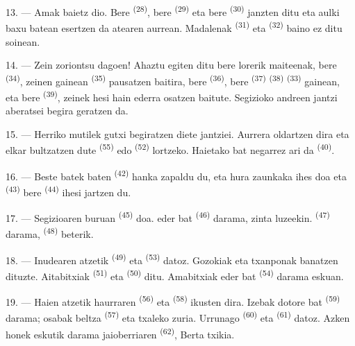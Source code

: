 13. --- Amak baietz dio. Bere  \textsuperscript{(28)}, bere
 \textsuperscript{(29)} eta bere 
\textsuperscript{(30)} janzten ditu eta aulki baxu batean esertzen da atearen
aurrean. Madalenak  \textsuperscript{(31)} eta 
\textsuperscript{(32)} baino ez ditu soinean.

14. --- Zein zoriontsu dagoen! Ahaztu egiten ditu bere lorerik maiteenak, bere
 \textsuperscript{(34)}, zeinen gainean 
\textsuperscript{(35)} pausatzen baitira, bere 
\textsuperscript{(36)}, bere  \textsuperscript{(37)}
 \textsuperscript{(38)} 
\textsuperscript{(33)} gainean, eta bere 
\textsuperscript{(39)}, zeinek hesi hain ederra osatzen baitute. Segizioko andreen
jantzi aberatsei begira geratzen da.

15. --- Herriko mutilek gutxi begiratzen diete jantziei. Aurrera oldartzen dira
eta elkar bultzatzen dute  \textsuperscript{(55)} edo
 \textsuperscript{(52)} lortzeko. Haietako bat negarrez ari da
\textsuperscript{(40)}.

16. --- Beste batek  baten \textsuperscript{(42)} hanka zapaldu du,
eta hura zaunkaka ihes doa eta  \textsuperscript{(43)} bere
 \textsuperscript{(44)} ihesi jartzen du.

\VUsaut{5.0mm}
\VUsaut{4.0mm}

17. --- Segizioaren buruan  \textsuperscript{(45)} doa. 
eder bat \textsuperscript{(46)} darama, zinta luzeekin. 
\textsuperscript{(47)} darama,  \textsuperscript{(48)} beterik.

18. --- Inudearen atzetik  \textsuperscript{(49)} eta
 \textsuperscript{(53)} datoz. Gozokiak eta txanponak banatzen
dituzte. Aitabitxiak  \textsuperscript{(51)} eta
 \textsuperscript{(50)} ditu. Amabitxiak 
eder bat \textsuperscript{(54)} darama eskuan.

19. --- Haien atzetik haurraren  \textsuperscript{(56)} eta
 \textsuperscript{(58)} ikusten dira. Izebak 
dotore bat \textsuperscript{(59)} darama; osabak  beltza
\textsuperscript{(57)} eta txaleko zuria. Urrunago 
\textsuperscript{(60)} eta  \textsuperscript{(61)} datoz. Azken
honek eskutik darama jaioberriaren  \textsuperscript{(62)}, Berta
txikia.

